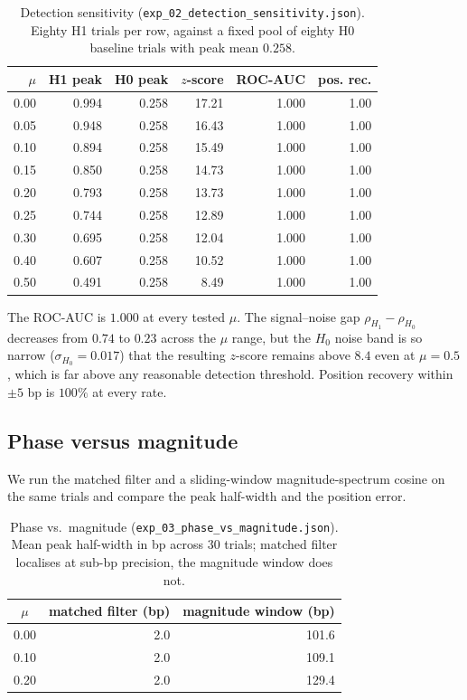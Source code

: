 \documentclass[twocolumn,11pt,a4paper]{article}
\theoremstyle{definition}
\theoremstyle{remark}
\begin{document}
\begin{table}[t]
  \centering\small
  \caption{Detection sensitivity (\texttt{exp\_02\_detection\_sensitivity.json}).
  Eighty H1 trials per row, against a fixed pool of eighty H0 baseline
  trials with peak mean $0.258$.}
  \label{tab:det}
  \begin{tabular}{r | r r r r r}
    \toprule
    $\mu$ & H1 peak & H0 peak & $z$-score & ROC-AUC & pos. rec. \\
    \midrule
    0.00 & 0.994 & 0.258 & 17.21 & 1.000 & 1.00 \\
    0.05 & 0.948 & 0.258 & 16.43 & 1.000 & 1.00 \\
    0.10 & 0.894 & 0.258 & 15.49 & 1.000 & 1.00 \\
    0.15 & 0.850 & 0.258 & 14.73 & 1.000 & 1.00 \\
    0.20 & 0.793 & 0.258 & 13.73 & 1.000 & 1.00 \\
    0.25 & 0.744 & 0.258 & 12.89 & 1.000 & 1.00 \\
    0.30 & 0.695 & 0.258 & 12.04 & 1.000 & 1.00 \\
    0.40 & 0.607 & 0.258 & 10.52 & 1.000 & 1.00 \\
    0.50 & 0.491 & 0.258 & \phantom{0}8.49 & 1.000 & 1.00 \\
    \bottomrule
  \end{tabular}
\end{table}

The ROC-AUC is $1.000$ at every tested $\mu$. The signal--noise gap
$\rho_{H_1} - \rho_{H_0}$ decreases from $0.74$ to $0.23$ across the
$\mu$ range, but the $H_0$ noise band is so narrow ($\sigma_{H_0} =
0.017$) that the resulting $z$-score remains above $8.4$ even at
$\mu = 0.5$, which is far above any reasonable detection threshold.
Position recovery within $\pm 5$ bp is $100\%$ at every rate.

\subsection{Phase versus magnitude}
\label{sec:exp:phase}

We run the matched filter and a sliding-window magnitude-spectrum
cosine on the same trials and compare the peak half-width and the
position error.



\begin{table}[t]
  \centering\small
  \caption{Phase vs.\ magnitude
  (\texttt{exp\_03\_phase\_vs\_magnitude.json}). Mean peak half-width
  in bp across $30$ trials; matched filter localises at sub-bp
  precision, the magnitude window does not.}
  \label{tab:phase}
  \begin{tabular}{c | r r}
    \toprule
    $\mu$ & matched filter (bp) & magnitude window (bp) \\
    \midrule
    0.00 & 2.0 & 101.6 \\
    0.10 & 2.0 & 109.1 \\
    0.20 & 2.0 & 129.4 \\
    \bottomrule
  \end{tabular}
\end{table}
\end{document}
